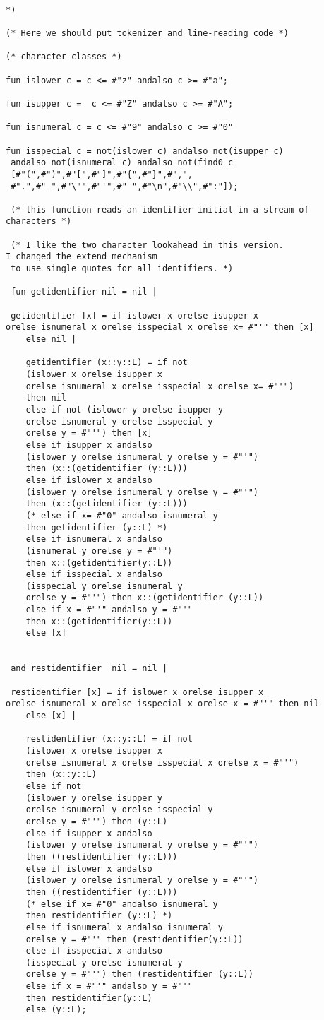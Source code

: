 \documentclass[12pt]{article}
\begin{document}
\begin{verbatim}

*)

(* Here we should put tokenizer and line-reading code *)

(* character classes *)

fun islower c = c <= #"z" andalso c >= #"a";

fun isupper c =  c <= #"Z" andalso c >= #"A";

fun isnumeral c = c <= #"9" andalso c >= #"0"

fun isspecial c = not(islower c) andalso not(isupper c)
 andalso not(isnumeral c) andalso not(find0 c
 [#"(",#")",#"[",#"]",#"{",#"}",#",",
 #".",#"_",#"\"",#"'",#" ",#"\n",#"\\",#":"]);
 
 (* this function reads an identifier initial in a stream of characters *)
 
 (* I like the two character lookahead in this version.  
I changed the extend mechanism
 to use single quotes for all identifiers. *)
 
 fun getidentifier nil = nil |
 
 getidentifier [x] = if islower x orelse isupper x 
orelse isnumeral x orelse isspecial x orelse x= #"'" then [x]
    else nil |
	
	getidentifier (x::y::L) = if not 
	(islower x orelse isupper x 
	orelse isnumeral x orelse isspecial x orelse x= #"'") 
	then nil
	else if not (islower y orelse isupper y 
	orelse isnumeral y orelse isspecial y 
	orelse y = #"'") then [x]
	else if isupper x andalso 
	(islower y orelse isnumeral y orelse y = #"'")
	then (x::(getidentifier (y::L)))
	else if islower x andalso 
	(islower y orelse isnumeral y orelse y = #"'")
	then (x::(getidentifier (y::L)))
	(* else if x= #"0" andalso isnumeral y 
	then getidentifier (y::L) *)
	else if isnumeral x andalso 
	(isnumeral y orelse y = #"'") 
	then x::(getidentifier(y::L))
	else if isspecial x andalso 
	(isspecial y orelse isnumeral y 
	orelse y = #"'") then x::(getidentifier (y::L))
	else if x = #"'" andalso y = #"'" 
	then x::(getidentifier(y::L))
	else [x]
	
 
 and restidentifier  nil = nil |
 
 restidentifier [x] = if islower x orelse isupper x 
orelse isnumeral x orelse isspecial x orelse x = #"'" then nil
    else [x] |
	
	restidentifier (x::y::L) = if not 
	(islower x orelse isupper x 
	orelse isnumeral x orelse isspecial x orelse x = #"'") 
	then (x::y::L)
	else if not 
	(islower y orelse isupper y 
	orelse isnumeral y orelse isspecial y 
	orelse y = #"'") then (y::L)
	else if isupper x andalso 
	(islower y orelse isnumeral y orelse y = #"'")
	then ((restidentifier (y::L)))
	else if islower x andalso 
	(islower y orelse isnumeral y orelse y = #"'") 
	then ((restidentifier (y::L)))
	(* else if x= #"0" andalso isnumeral y 
	then restidentifier (y::L) *)
	else if isnumeral x andalso isnumeral y 
	orelse y = #"'" then (restidentifier(y::L))
	else if isspecial x andalso 
	(isspecial y orelse isnumeral y 
	orelse y = #"'") then (restidentifier (y::L))
	else if x = #"'" andalso y = #"'" 
	then restidentifier(y::L)
	else (y::L);
 

\end{verbatim}
\end{document}
